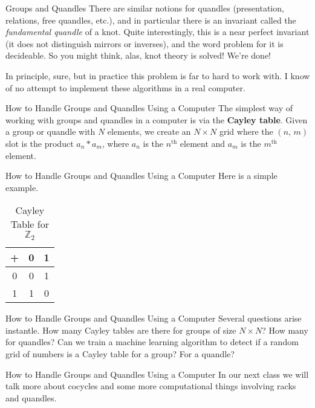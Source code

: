 \documentclass{beamer}
\begin{document}
    \begin{frame}{Groups and Quandles}
        There are similar notions for quandles (presentation, relations,
        free quandles, etc.), and in particular there is an invariant called the
        \textit{fundamental quandle} of a knot. Quite interestingly, this is a
        near perfect invariant (it does not distinguish mirrors or inverses),
        and the word problem for it is decideable. So you might think, alas,
        knot theory is solved! We're done!
        \par\hfill\par
        In principle, sure, but in practice this problem is far to hard to work
        with. I know of no attempt to implement these algorithms in a real computer.
    \end{frame}
    \begin{frame}{How to Handle Groups and Quandles Using a Computer}
        The simplest way of working with groups and quandles in a computer is via
        the \textbf{Cayley table}. Given a group or quandle with $N$ elements,
        we create an $N\times{N}$ grid where the $(n,\,m)$ slot is the product
        $a_{n}*a_{m}$, where $a_{n}$ is the $n^{\textrm{th}}$ element and
        $a_{m}$ is the $m^{\textrm{th}}$ element.
    \end{frame}
    \begin{frame}{How to Handle Groups and Quandles Using a Computer}
        Here is a simple example.
        \begin{table}
            \centering
            \begin{tabular}{c|cc}
                +&0&1\\
                \hline
                0&0&1\\
                1&1&0
            \end{tabular}
            \caption{Cayley Table for $\mathbb{Z}_{2}$}
        \end{table}
    \end{frame}
    \begin{frame}{How to Handle Groups and Quandles Using a Computer}
        Several questions arise instantle. How many Cayley tables are there
        for groups of size $N\times{N}$? How many for quandles?
        Can we train a machine learning algorithm to detect if a random
        grid of numbers is a Cayley table for a group? For a quandle?
    \end{frame}
    \begin{frame}{How to Handle Groups and Quandles Using a Computer}
        In our next class we will talk more about cocycles and some more
        computational things involving racks and quandles.
    \end{frame}
\end{document}
